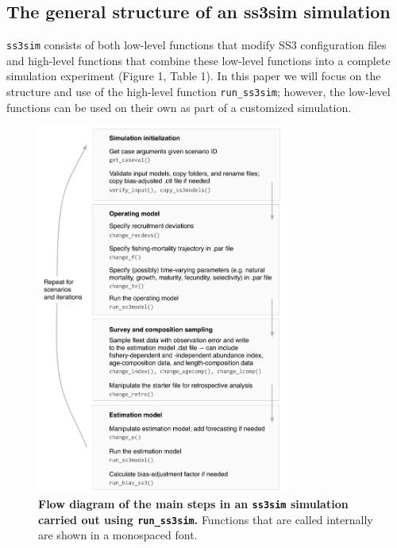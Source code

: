 \documentclass[11pt]{article}
\begin{document}
\subsection*{The general structure of an ss3sim simulation}

\texttt{ss3sim} consists of both low-level functions that modify SS3 configuration files and high-level functions that combine these low-level functions into a complete simulation experiment (Figure 1, Table 1). In this paper we will focus on the structure and use of the high-level function \texttt{run\_ss3sim}; however, the low-level functions can be used on their own as part of a customized simulation.

\begin{figure}[htb]
\begin{center}
\includegraphics[width=3.27in]{sim-steps.pdf}
\end{center}
\caption{
{\bf Flow diagram of the main steps
in an \texttt{ss3sim} simulation carried out using \texttt{run\_ss3sim}.}
Functions that are called internally are shown in a monospaced font.
}
\label{fig:sim-steps}
\end{figure}
\end{document}

